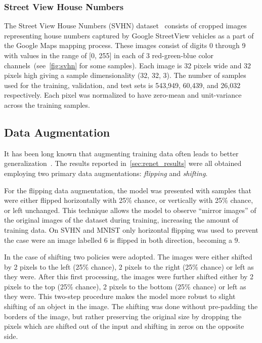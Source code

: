\subsubsection{Street View House Numbers}
The Street View House Numbers (SVHN) dataset~\citep{Netzer-wkshp-2011} consists
of cropped images representing house numbers captured by Google StreetView
vehicles as a part of the Google Maps mapping process. These images consist of
digits 0 through 9 with values in the range of [0, 255] in each of 3
red-green-blue color channels~(see~\autoref{fig:svhn} for some samples). Each
image is 32 pixels wide and 32 pixels high giving a sample dimensionality (32,
32, 3). The number of samples used for the training, validation, and test sets
is 543,949, 60,439, and 26,032 respectively. Each pixel was normalized to have
zero-mean and unit-variance across the training samples.

\subsection{Data Augmentation}

It has been long known that augmenting training data often leads to better
generalization~\citep[see, e.g.,][]{Krizhevsky-2012}. The results reported
in~\autoref{sec:renet_results} were all obtained employing two primary data
augmentations: {\it flipping} and {\it shifting}.

For the flipping data augmentation, the model was presented with samples that
were either flipped horizontally with 25\% chance, or vertically with 25\%
chance, or left unchanged. This technique allows the model to observe ``mirror
images'' of the original images of the dataset during training, increasing the
amount of training data. On SVHN and MNIST only horizontal flipping was used
to prevent the case were an image labelled $6$ is flipped in both direction,
becoming a $9$.

In the case of shifting two policies were adopted. The images were either
shifted by 2 pixels to the left (25\% chance), 2 pixels to the right (25\%
chance) or left as they were. After this first processing, the images were
further shifted either by 2 pixels to the top (25\% chance), 2 pixels to the
bottom (25\% chance) or left as they were. This two-step procedure makes the
model more robust to slight shifting of an object in the image. The shifting
was done without pre-padding the borders of the image, but rather preserving
the original size by dropping the pixels which are shifted out of the input
and shifting in zeros on the opposite side.

